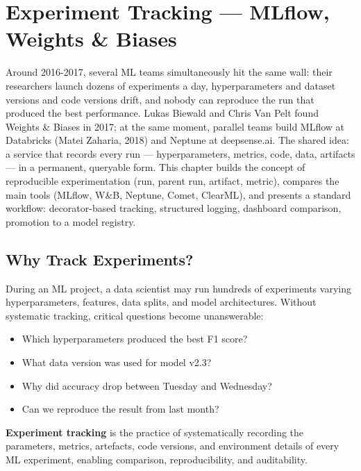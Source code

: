 \chapter{Experiment Tracking --- MLflow, Weights \& Biases}
\label{ch:experiment-tracking}

Around 2016-2017, several ML teams simultaneously hit the same wall: their researchers launch dozens of experiments a day, hyperparameters and dataset versions and code versions drift, and nobody can reproduce the run that produced the best performance. Lukas Biewald and Chris Van Pelt found Weights \& Biases in 2017; at the same moment, parallel teams build MLflow at Databricks (Matei Zaharia, 2018) and Neptune at deepsense.ai. The shared idea: a service that records every run --- hyperparameters, metrics, code, data, artifacts --- in a permanent, queryable form. This chapter builds the concept of reproducible experimentation (run, parent run, artifact, metric), compares the main tools (MLflow, W\&B, Neptune, Comet, ClearML), and presents a standard workflow: decorator-based tracking, structured logging, dashboard comparison, promotion to a model registry.

\section{Why Track Experiments?}
\label{sec:why-tracking}

During an ML project, a data scientist may run hundreds of experiments
varying hyperparameters, features, data splits, and model architectures.
Without systematic tracking, critical questions become unanswerable:

\begin{itemize}
  \item Which hyperparameters produced the best F1 score?
  \item What data version was used for model v2.3?
  \item Why did accuracy drop between Tuesday and Wednesday?
  \item Can we reproduce the result from last month?
\end{itemize}

\begin{definition}
\textbf{Experiment tracking} is the practice of
systematically recording the parameters, metrics, artefacts, code versions,
and environment details of every ML experiment, enabling comparison,
reproducibility, and auditability.
\end{definition}

